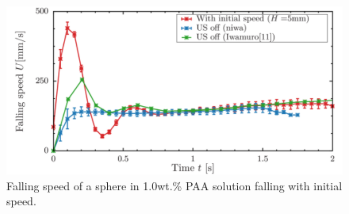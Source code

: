 \begin{figure}[H]
    \begin{center}
        \includegraphics[width=15cm,clip]{X-Appendix/h-5.png}
        \caption{Falling speed of a sphere in 1.0wt.\% PAA solution falling with initial speed.}
        \label{fig:h-5}
    \end{center}
\end{figure}